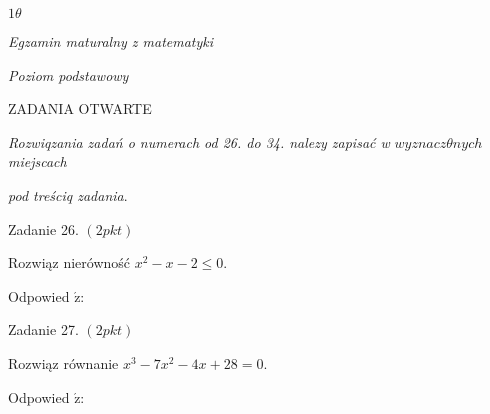 \documentclass[a4paper,12pt]{article}
\begin{document}
$ 1\theta$

{\it Egzamin maturalny z matematyki}

{\it Poziom podstawowy}

ZADANIA OTWARTE

{\it Rozwiqzania zadań o numerach od 26. do 34. nalezy zapisać w} $wyznacz\theta nych$ {\it miejscach}

{\it pod treściq zadania}.

Zadanie 26. $(2pkt)$

Rozwiąz nierówność $x^{2}-x-2\leq 0.$

Odpowied $\acute{\mathrm{z}}$:

Zadanie 27. $(2pkt)$

Rozwiąz równanie $x^{3}-7x^{2}-4x+28=0.$

Odpowied $\acute{\mathrm{z}}$:
\end{document}
